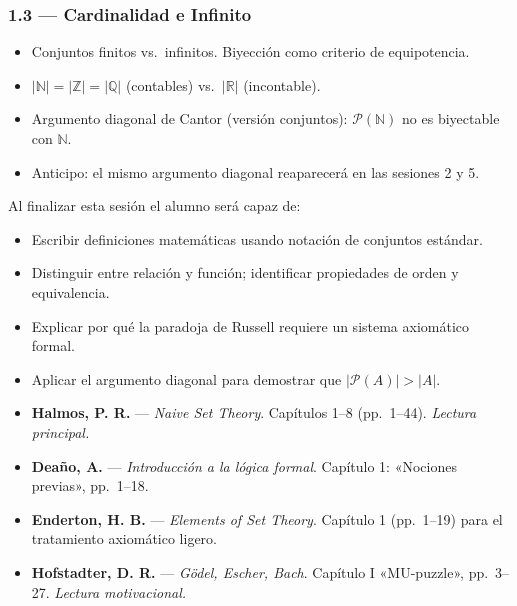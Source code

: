 \documentclass[11pt, letterpaper]{article}
\begin{document}
\subsubsection{1.3 — Cardinalidad e Infinito}
\begin{itemize}
  \item Conjuntos finitos vs.\ infinitos. Biyección como criterio de equipotencia.
  \item $|\mathbb{N}|=|\mathbb{Z}|=|\mathbb{Q}|$ (contables) vs.\ $|\mathbb{R}|$ (incontable).
  \item Argumento diagonal de Cantor (versión conjuntos): $\mathcal{P}(\mathbb{N})$ no es biyectable con $\mathbb{N}$.
  \item Anticipo: el mismo argumento diagonal reaparecerá en las sesiones 2 y 5.
\end{itemize}

\begin{objetivos}
Al finalizar esta sesión el alumno será capaz de:
\begin{itemize}
  \item Escribir definiciones matemáticas usando notación de conjuntos estándar.
  \item Distinguir entre relación y función; identificar propiedades de orden y equivalencia.
  \item Explicar por qué la paradoja de Russell requiere un sistema axiomático formal.
  \item Aplicar el argumento diagonal para demostrar que $|\mathcal{P}(A)|>|A|$.
\end{itemize}
\end{objetivos}

\begin{lecturas}
\begin{itemize}
  \item[$(\star)$] \textbf{Halmos, P. R.} — \emph{Naive Set Theory}. Capítulos 1--8 (pp.\ 1--44). \textit{Lectura principal.}
  \item[$(\star)$] \textbf{Deaño, A.} — \emph{Introducción a la lógica formal}. Capítulo 1: «Nociones previas», pp.\ 1--18.
  \item \textbf{Enderton, H. B.} — \emph{Elements of Set Theory}. Capítulo 1 (pp.\ 1--19) para el tratamiento axiomático ligero.
  \item \textbf{Hofstadter, D. R.} — \emph{Gödel, Escher, Bach}. Capítulo I «MU-puzzle», pp.\ 3--27. \textit{Lectura motivacional.}
\end{itemize}
\end{lecturas}
\end{document}
